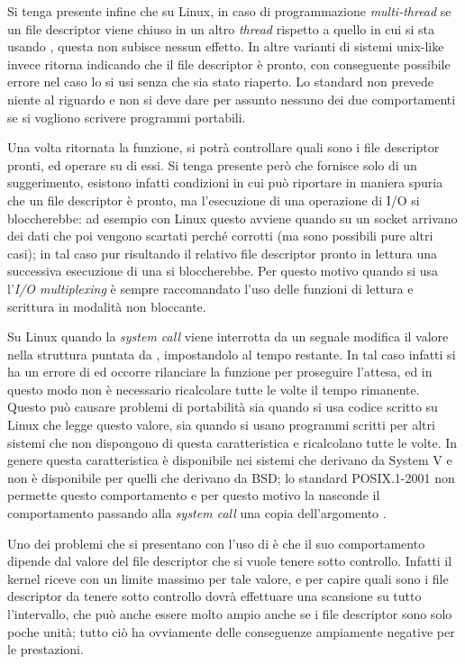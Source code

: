 Si tenga presente infine che su Linux, in caso di programmazione
\textit{multi-thread} se un file descriptor viene chiuso in un altro
\textit{thread} rispetto a quello in cui si sta usando , questa
non subisce nessun effetto. In altre varianti di sistemi unix-like invece
 ritorna indicando che il file descriptor è pronto, con
conseguente possibile errore nel caso lo si usi senza che sia stato
riaperto. Lo standard non prevede niente al riguardo e non si deve dare per
assunto nessuno dei due comportamenti se si vogliono scrivere programmi
portabili.


Una volta ritornata la funzione, si potrà controllare quali sono i file
descriptor pronti, ed operare su di essi. Si tenga presente però che
 fornisce solo di un suggerimento, esistono infatti condizioni in
cui  può riportare in maniera spuria che un file descriptor è
pronto, ma l'esecuzione di una operazione di I/O si bloccherebbe: ad esempio
con Linux questo avviene quando su un socket arrivano dei dati che poi vengono
scartati perché corrotti (ma sono possibili pure altri casi); in tal caso pur
risultando il relativo file descriptor pronto in lettura una successiva
esecuzione di una  si bloccherebbe. Per questo motivo quando si usa
l'\textit{I/O multiplexing} è sempre raccomandato l'uso delle funzioni di
lettura e scrittura in modalità non bloccante.

Su Linux quando la \textit{system call}  viene interrotta da un
segnale modifica il valore nella struttura puntata da ,
impostandolo al tempo restante. In tal caso infatti si ha un errore di
 ed occorre rilanciare la funzione per proseguire l'attesa, ed
in questo modo non è necessario ricalcolare tutte le volte il tempo
rimanente. Questo può causare problemi di portabilità sia quando si usa codice
scritto su Linux che legge questo valore, sia quando si usano programmi
scritti per altri sistemi che non dispongono di questa caratteristica e
ricalcolano  tutte le volte. In genere questa caratteristica è
disponibile nei sistemi che derivano da System V e non è disponibile per
quelli che derivano da BSD; lo standard POSIX.1-2001 non permette questo
comportamento e per questo motivo la  nasconde il comportamento
passando alla \textit{system call} una copia dell'argomento .

Uno dei problemi che si presentano con l'uso di  è che il suo
comportamento dipende dal valore del file descriptor che si vuole tenere sotto
controllo.  Infatti il kernel riceve con  un limite massimo per
tale valore, e per capire quali sono i file descriptor da tenere sotto
controllo dovrà effettuare una scansione su tutto l'intervallo, che può anche
essere molto ampio anche se i file descriptor sono solo poche unità; tutto ciò
ha ovviamente delle conseguenze ampiamente negative per le prestazioni.

